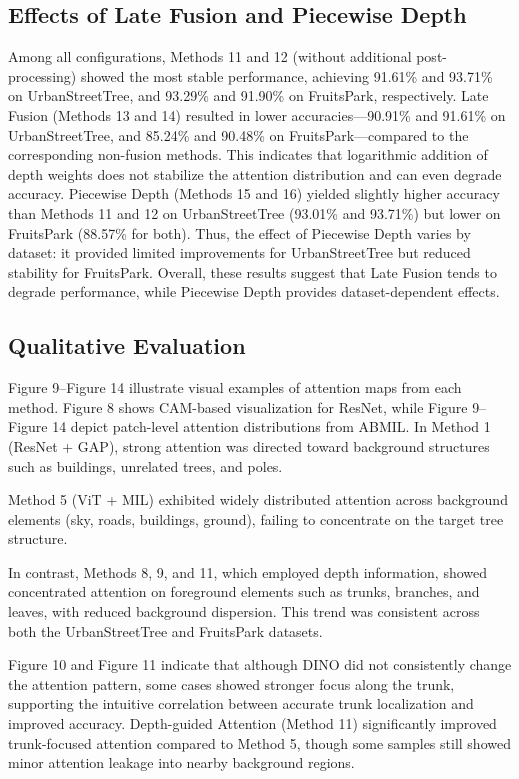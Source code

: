 \subsection{Effects of Late Fusion and Piecewise Depth}
Among all configurations, Methods 11 and 12 (without additional post-processing) showed the most stable performance, achieving 91.61\% and 93.71\% on UrbanStreetTree, and 93.29\% and 91.90\% on FruitsPark, respectively. Late Fusion (Methods 13 and 14) resulted in lower accuracies—90.91\% and 91.61\% on UrbanStreetTree, and 85.24\% and 90.48\% on FruitsPark—compared to the corresponding non-fusion methods. This indicates that logarithmic addition of depth weights does not stabilize the attention distribution and can even degrade accuracy. Piecewise Depth (Methods 15 and 16) yielded slightly higher accuracy than Methods 11 and 12 on UrbanStreetTree (93.01\% and 93.71\%) but lower on FruitsPark (88.57\% for both). Thus, the effect of Piecewise Depth varies by dataset: it provided limited improvements for UrbanStreetTree but reduced stability for FruitsPark. Overall, these results suggest that Late Fusion tends to degrade performance, while Piecewise Depth provides dataset-dependent effects.

\subsection{Qualitative Evaluation}
Figure 9–Figure 14 illustrate visual examples of attention maps from each method. Figure 8 shows CAM-based visualization for ResNet, while Figure 9–Figure 14 depict patch-level attention distributions from ABMIL. In Method 1 (ResNet + GAP), strong attention was directed toward background structures such as buildings, unrelated trees, and poles. 

Method 5 (ViT + MIL) exhibited widely distributed attention across background elements (sky, roads, buildings, ground), failing to concentrate on the target tree structure.

In contrast, Methods 8, 9, and 11, which employed depth information, showed concentrated attention on foreground elements such as trunks, branches, and leaves, with reduced background dispersion. This trend was consistent across both the UrbanStreetTree and FruitsPark datasets.

Figure 10 and Figure 11 indicate that although DINO did not consistently change the attention pattern, some cases showed stronger focus along the trunk, supporting the intuitive correlation between accurate trunk localization and improved accuracy. Depth-guided Attention (Method 11) significantly improved trunk-focused attention compared to Method 5, though some samples still showed minor attention leakage into nearby background regions. 

